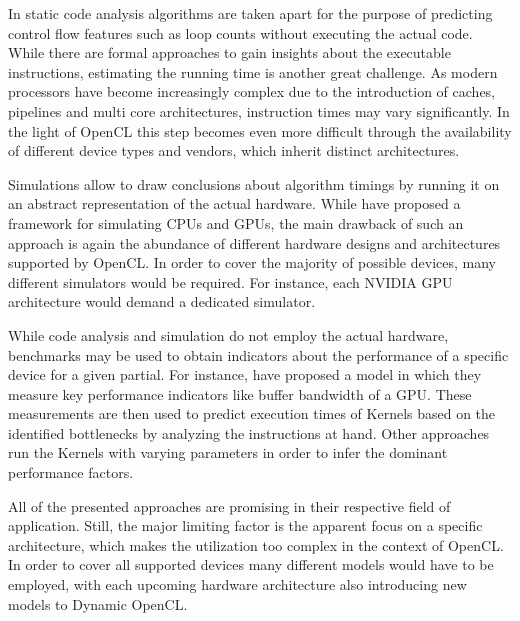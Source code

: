 In static code analysis algorithms are taken apart for the purpose of predicting control flow features such as loop counts without executing the actual code\cite{loopbound}\cite{sweet}. While there are formal approaches to gain insights about the executable instructions, estimating the running time is another great challenge. As modern processors have become increasingly complex due to the introduction of caches, pipelines and multi core architectures, instruction times may vary significantly\cite{wcet}. In the light of OpenCL this step becomes even more difficult through the availability of different device types and vendors, which inherit distinct architectures.

Simulations allow to draw conclusions about algorithm timings by running it on an abstract representation of the actual hardware\cite{wcet}. While \citeauthor{multi2sim} have proposed a framework for simulating CPUs and GPUs\cite{multi2sim}, the main drawback of such an approach is again the abundance of different hardware designs and architectures supported by OpenCL. In order to cover the majority of possible devices, many different simulators would be required. For instance, each NVIDIA GPU architecture would demand a dedicated simulator.

While code analysis and simulation do not employ the actual hardware, benchmarks may be used to obtain indicators about the performance of a specific device for a given partial. For instance, \citeauthor{quantitative_performance} have proposed a model in which they measure key performance indicators like buffer bandwidth of a GPU\cite{quantitative_performance}. These measurements are then used to predict execution times of Kernels based on the identified bottlenecks by analyzing the instructions at hand. Other approaches run the Kernels with varying parameters in order to infer the dominant performance factors\cite{gpgpu_performance}.

All of the presented approaches are promising in their respective field of application. Still, the major limiting factor is the apparent focus on a specific architecture, which makes the utilization too complex in the context of OpenCL. In order to cover all supported devices many different models would have to be employed, with each upcoming hardware architecture also introducing new models to Dynamic OpenCL.

